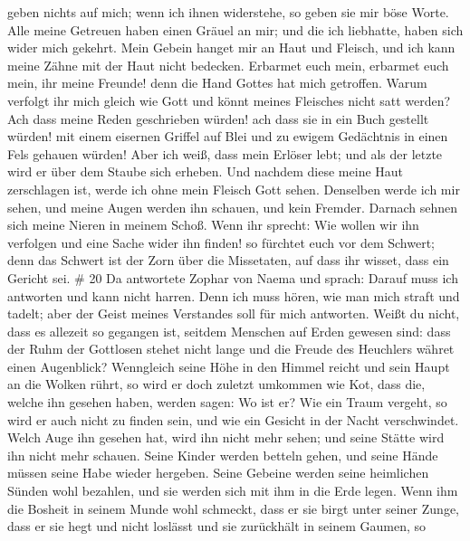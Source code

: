 geben nichts auf mich; wenn ich ihnen widerstehe, so geben sie mir böse
Worte.  Alle meine Getreuen haben einen Gräuel an mir; und
die ich liebhatte, haben sich wider mich gekehrt.  Mein
Gebein hanget mir an Haut und Fleisch, und ich kann meine Zähne mit der
Haut nicht bedecken.  Erbarmet euch mein, erbarmet euch
mein, ihr meine Freunde! denn die Hand Gottes hat mich getroffen.
 Warum verfolgt ihr mich gleich wie Gott und könnt meines
Fleisches nicht satt werden?  Ach dass meine Reden
geschrieben würden! ach dass sie in ein Buch gestellt würden!
 mit einem eisernen Griffel auf Blei und zu ewigem
Gedächtnis in einen Fels gehauen würden!  Aber ich weiß,
dass mein Erlöser lebt; und als der letzte wird er über dem Staube sich
erheben.  Und nachdem diese meine Haut zerschlagen ist,
werde ich ohne mein Fleisch Gott sehen.  Denselben werde
ich mir sehen, und meine Augen werden ihn schauen, und kein Fremder.
Darnach sehnen sich meine Nieren in meinem Schoß.  Wenn ihr
sprecht: Wie wollen wir ihn verfolgen und eine Sache wider ihn finden!
 so fürchtet euch vor dem Schwert; denn das Schwert ist der
Zorn über die Missetaten, auf dass ihr wisset, dass ein Gericht sei. \#
20  Da antwortete Zophar von Naema und sprach: 
Darauf muss ich antworten und kann nicht harren.  Denn ich
muss hören, wie man mich straft und tadelt; aber der Geist meines
Verstandes soll für mich antworten.  Weißt du nicht, dass es
allezeit so gegangen ist, seitdem Menschen auf Erden gewesen sind:
 dass der Ruhm der Gottlosen stehet nicht lange und die
Freude des Heuchlers währet einen Augenblick?  Wenngleich
seine Höhe in den Himmel reicht und sein Haupt an die Wolken rührt,
 so wird er doch zuletzt umkommen wie Kot, dass die, welche
ihn gesehen haben, werden sagen: Wo ist er?  Wie ein Traum
vergeht, so wird er auch nicht zu finden sein, und wie ein Gesicht in
der Nacht verschwindet.  Welch Auge ihn gesehen hat, wird
ihn nicht mehr sehen; und seine Stätte wird ihn nicht mehr schauen.
 Seine Kinder werden betteln gehen, und seine Hände müssen
seine Habe wieder hergeben.  Seine Gebeine werden seine
heimlichen Sünden wohl bezahlen, und sie werden sich mit ihm in die Erde
legen.  Wenn ihm die Bosheit in seinem Munde wohl schmeckt,
dass er sie birgt unter seiner Zunge,  dass er sie hegt und
nicht loslässt und sie zurückhält in seinem Gaumen,  so
